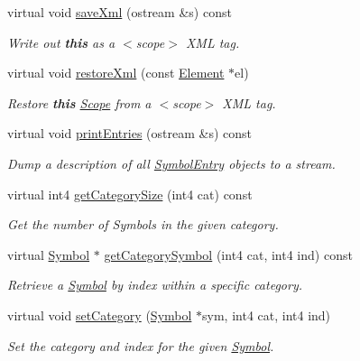 \begin{DoxyCompactItemize}
virtual void \mbox{\hyperlink{class_scope_internal_af73cb738b4a29cf9aa076ce382ff110f}{save\+Xml}} (ostream \&s) const
\begin{DoxyCompactList}\small\item\em Write out {\bfseries{this}} as a $<$scope$>$ X\+ML tag. \end{DoxyCompactList}\item 
virtual void \mbox{\hyperlink{class_scope_internal_ad79bd78299b2bea6c0f4221682e81b07}{restore\+Xml}} (const \mbox{\hyperlink{class_element}{Element}} $\ast$el)
\begin{DoxyCompactList}\small\item\em Restore {\bfseries{this}} \mbox{\hyperlink{class_scope}{Scope}} from a $<$scope$>$ X\+ML tag. \end{DoxyCompactList}\item 
virtual void \mbox{\hyperlink{class_scope_internal_aac820e63b0d1739b9f14e15898fc9a9e}{print\+Entries}} (ostream \&s) const
\begin{DoxyCompactList}\small\item\em Dump a description of all \mbox{\hyperlink{class_symbol_entry}{Symbol\+Entry}} objects to a stream. \end{DoxyCompactList}\item 
virtual int4 \mbox{\hyperlink{class_scope_internal_a4ccbbc37afa4eee7c6cce98dbd3a5bff}{get\+Category\+Size}} (int4 cat) const
\begin{DoxyCompactList}\small\item\em Get the number of Symbols in the given category. \end{DoxyCompactList}\item 
virtual \mbox{\hyperlink{class_symbol}{Symbol}} $\ast$ \mbox{\hyperlink{class_scope_internal_af0414fde624b56947bfa25863ea1a01e}{get\+Category\+Symbol}} (int4 cat, int4 ind) const
\begin{DoxyCompactList}\small\item\em Retrieve a \mbox{\hyperlink{class_symbol}{Symbol}} by index within a specific {\itshape category}. \end{DoxyCompactList}\item 
virtual void \mbox{\hyperlink{class_scope_internal_aee7ec7a7253a5cdcfa61b88f01e9918d}{set\+Category}} (\mbox{\hyperlink{class_symbol}{Symbol}} $\ast$sym, int4 cat, int4 ind)
\begin{DoxyCompactList}\small\item\em Set the {\itshape category} and index for the given \mbox{\hyperlink{class_symbol}{Symbol}}. \end{DoxyCompactList}\end{DoxyCompactItemize}
